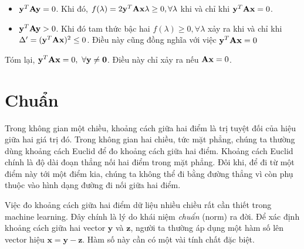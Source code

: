 \begin{enumerate}
\begin{itemize}
\item $\mathbf{y}^T\mathbf{A}\mathbf{y} = 0$. Khi đó, $f(\lambda) = 2\mathbf{y}^T\mathbf{A}\mathbf{x} \lambda
\geq 0, \forall \lambda$ khi và chỉ khi $\mathbf{y}^T\mathbf{A}\mathbf{x} = 0$.

\item $\mathbf{y}^T\mathbf{A}\mathbf{y} > 0$. Khi đó tam thức bậc hai $f(\lambda) \geq 0,
\forall \lambda$ xảy ra khi và chỉ khi $\Delta' = (\mathbf{y}^T\mathbf{A}\mathbf{x})^2 \leq
0$. Điều này cũng đồng nghĩa với việc $\mathbf{y}^T\mathbf{A}\mathbf{x} = 0$
\end{itemize}
Tóm lại, $\mathbf{y}^T\mathbf{A}\mathbf{x} = 0, ~\forall \mathbf{y} \neq \mathbf{0}$. Điều này chỉ xảy
ra nếu $\mathbf{A}\mathbf{x} = 0$.  \dpcm %

\end{enumerate}








\section{Chuẩn}
\label{sec:2_norm}
Trong không gian một chiều, khoảng cách giữa hai điểm là trị tuyệt đối của hiệu
giữa hai giá trị đó. Trong không gian hai chiều, tức mặt phẳng, chúng ta thường
dùng khoảng cách Euclid để đo khoảng cách giữa hai điểm. Khoảng cách Euclid
chính là độ dài đoạn thẳng nối hai điểm trong mặt phẳng. Đôi khi, để đi từ một
điểm này tới một điểm kia, chúng ta không thể đi bằng đường thẳng vì còn phụ
thuộc vào hình dạng đường đi nối giữa hai điểm.

Việc đo khoảng cách giữa hai điểm dữ liệu nhiều chiều rất cần thiết trong
machine learning. Đây chính là lý do khái niệm \textit{chuẩn} ({norm}) ra
đời. Để xác định khoảng cách giữa hai vector $\mathbf{y}$ và $\mathbf{z}$, người
ta thường áp dụng một hàm số lên vector hiệu $\mathbf{x = y - z}$. Hàm số này
cần có một vài tính chất đặc biệt.

